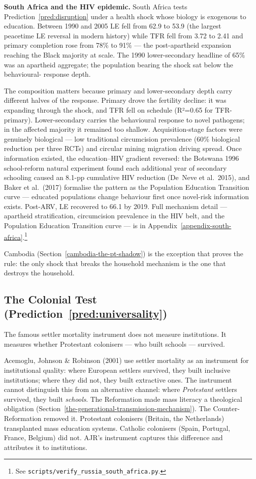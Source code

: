 \documentclass[12pt,letterpaper]{article}
\begin{document}
\textbf{South Africa and the HIV epidemic.} South Africa tests
Prediction~\ref{pred:disruption} under a health shock whose biology is
exogenous to education. Between 1990 and 2005 LE fell from 62.9 to
53.9 (the largest peacetime LE reversal in modern history) while TFR
fell from 3.72 to 2.41 and primary completion rose from 78\% to
91\% --- the post-apartheid expansion reaching the Black majority at
scale. The 1990 lower-secondary headline of 65\% was an apartheid
aggregate; the population bearing the shock sat below the behavioural-
response depth.

The composition matters because primary and lower-secondary depth
carry different halves of the response. Primary drove the fertility
decline: it was expanding through the shock, and TFR fell on schedule
(R²=0.65 for TFR-primary). Lower-secondary carries the behavioural
response to novel pathogens; in the affected majority it remained too
shallow. Acquisition-stage factors were genuinely biological ---
low traditional circumcision prevalence (60\% biological reduction per
three RCTs) and circular mining migration driving spread. Once
information existed, the education--HIV gradient reversed: the
Botswana 1996 school-reform natural experiment found each additional
year of secondary schooling caused an 8.1-pp cumulative HIV reduction
(De~Neve et al.~2015), and Baker et al.~(2017) formalise the pattern
as the Population Education Transition curve --- educated populations
change behaviour first once novel-risk information exists. Post-ARV,
LE recovered to 66.1 by 2019. Full mechanism detail --- apartheid
stratification, circumcision prevalence in the HIV belt, and the
Population Education Transition curve --- is in
Appendix~\ref{appendix-south-africa}.\footnote{See
\texttt{scripts/verify\_russia\_south\_africa.py}.}

Cambodia (Section~\ref{cambodia-the-pt-shadow}) is the exception that
proves the rule: the only shock that breaks the household mechanism is
the one that destroys the household.

\subsection{The Colonial Test (Prediction~\ref{pred:universality})}\label{the-colonial-test}

The famous settler mortality instrument does not measure institutions. It measures whether Protestant colonisers --- who built schools --- survived.

Acemoglu, Johnson \& Robinson (2001) use settler mortality as an
instrument for institutional quality: where European settlers survived,
they built inclusive institutions; where they did not, they built
extractive ones. The instrument cannot distinguish this from an
alternative channel: where \emph{Protestant} settlers survived, they
built \emph{schools}. The Reformation made mass literacy a theological
obligation (Section~\ref{the-generational-transmission-mechanism}). The Counter-Reformation removed it. Protestant
colonisers (Britain, the Netherlands) transplanted mass education
systems. Catholic colonisers (Spain, Portugal, France, Belgium) did not.
AJR's instrument captures this difference and attributes it to
institutions.
\end{document}
